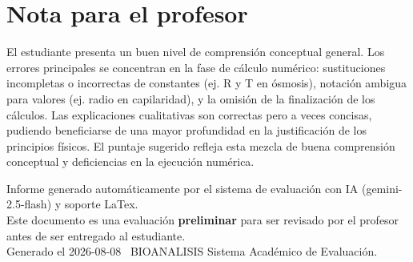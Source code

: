 \documentclass[11pt,a4paper]{article}
\begin{document}
\section*{Nota para el profesor}
\begin{tcolorbox}[
  enhanced, breakable,
  colback=yellow!8, colframe=yellow!60!black,
  fonttitle=\bfseries, coltitle=black,
  title={Observaciones para revisión manual},
  top=4pt, bottom=4pt, left=8pt, right=8pt,
]
El estudiante presenta un buen nivel de comprensión conceptual general. Los errores principales se concentran en la fase de cálculo numérico: sustituciones incompletas o incorrectas de constantes (ej. R y T en ósmosis), notación ambigua para valores (ej. radio en capilaridad), y la omisión de la finalización de los cálculos. Las explicaciones cualitativas son correctas pero a veces concisas, pudiendo beneficiarse de una mayor profundidad en la justificación de los principios físicos. El puntaje sugerido refleja esta mezcla de buena comprensión conceptual y deficiencias en la ejecución numérica.
\end{tcolorbox}

\vspace{12pt}
\begin{center}
  \footnotesize\color{gray}
  Informe generado automáticamente por el sistema de evaluación con IA (gemini-2.5-flash) y soporte LaTex. \\
  Este documento es una evaluación \textbf{preliminar} para ser revisado por el profesor antes de ser entregado al 
  estudiante. \\
  Generado el 2026-08-08 \textbullet\ BIOANALISIS Sistema Académico de Evaluación.
  \end{center}
\end{document}
